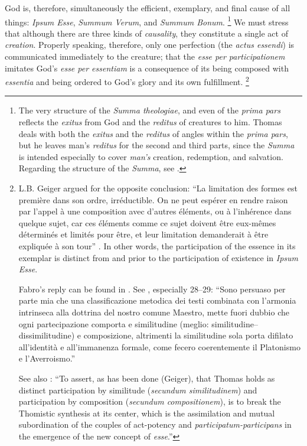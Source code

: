 %
God is, therefore, simultaneously the efficient, exemplary, and final cause of all things: \emph{Ipsum Esse}, \emph{Summum Verum}, and \emph{Summum Bonum}.%
%
\footnote{The very structure of the \emph{Summa theologiae}, and even of the \emph{prima pars} reflects the \emph{exitus} from God and the \emph{reditus} of creatures to him. Thomas deals with both the \emph{exitus} and the \emph{reditus} of angles within the \emph{prima pars}, but he leaves man’s \emph{reditus} for the second and third parts, since the \emph{Summa} is intended especially to cover \emph{man’s} creation, redemption, and salvation. Regarding the structure of the \emph{Summa}, see \cite{patfoort:unite}.}
%
We must stress that although there are three kinds of \emph{causality}, they constitute a single act of \emph{creation}. Properly speaking, therefore, only one perfection (the \emph{actus essendi}) is communicated immediately to the creature; that the \emph{esse per participationem} imitates God’s \emph{esse per essentiam} is a consequence of its being composed with \emph{essentia} and being ordered to God’s glory and its own fulfillment.%
%
\footnote{L.B. Geiger argued for the opposite conclusion: “La limitation des formes est première dans son ordre, irréductible. On ne peut espérer en rendre raison par l’appel à une composition avec d’autres éléments, ou à l’inhérence dans quelque sujet, car ces éléments comme ce sujet doivent être eux-mêmes déterminés et limités pour être, et leur limitation demanderait à être expliquée à son tour” \parencite[65]{geiger:participation}. In other words, the participation of the essence in its exemplar is distinct from and prior to the participation of existence in \emph{Ipsum Esse}.

Fabro’s reply can be found in \cite[52–60]{fabro:partecipazione}. See \cite[26–29]{fabro:nozione}, especially 28–29: “Sono persuaso per parte mia che una classificazione metodica dei testi combinata con l’armonia intrinseca alla dottrina del nostro comune Maestro, mette fuori dubbio che ogni partecipazione comporta e similitudine (meglio: similitudine–dissimilitudine) e composizione, altrimenti la similitudine sola porta difilato all’identità e all’immanenza formale, come fecero coerentemente il Platonismo e l’Averroismo.”

See also \cite[469]{fabro:intensive}: “To assert, as has been done (Geiger), that Thomas holds as distinct participation by similitude (\emph{secundum similitudinem}) and participation by composition (\emph{secundum compositionem}), is to break the Thomistic synthesis at its center, which is the assimilation and mutual subordination of the couples of act-potency and \emph{participatum-participans} in the emergence of the new concept of \emph{esse}.” }%

